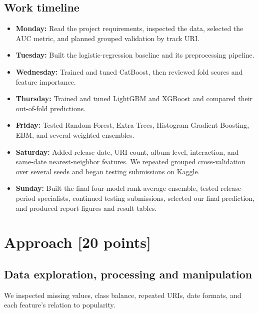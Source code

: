 \documentclass{article}
\begin{document}
\subsection{Work timeline}
\begin{itemize}
  \item \textbf{Monday:} Read the project requirements, inspected the data,
  selected the AUC metric, and planned grouped validation by track URI.
  \item \textbf{Tuesday:} Built the logistic-regression baseline and its
  preprocessing pipeline.
  \item \textbf{Wednesday:} Trained and tuned CatBoost, then reviewed fold
  scores and feature importance.
  \item \textbf{Thursday:} Trained and tuned LightGBM and XGBoost and compared
  their out-of-fold predictions.
  \item \textbf{Friday:} Tested Random Forest, Extra Trees, Histogram Gradient
  Boosting, EBM, and several weighted ensembles.
  \item \textbf{Saturday:} Added release-date, URI-count, album-level,
  interaction, and same-date nearest-neighbor features. We repeated grouped
  cross-validation over several seeds and began testing submissions on Kaggle.
  \item \textbf{Sunday:} Built the final four-model rank-average ensemble,
  tested release-period specialists, continued testing submissions, selected
  our final prediction, and produced report figures and result tables.
\end{itemize}

\newpage

\section{Approach [20 points]}
\subsection{Data exploration, processing and manipulation}
We inspected missing values, class balance, repeated URIs, date formats, and
each feature's relation to popularity.
\end{document}
